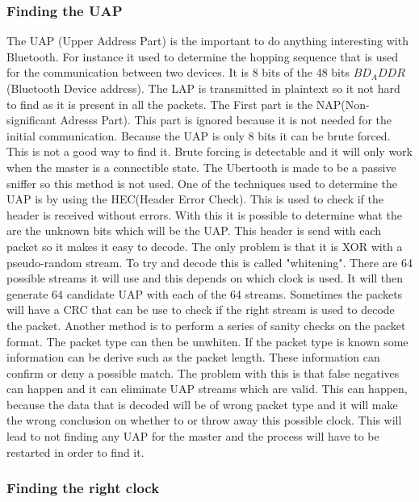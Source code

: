 \subsubsection{Finding the UAP}
\label{subsubsec:finding_uap}
The UAP (Upper Address Part) is the important to do anything interesting with Bluetooth. For instance it used to determine the hopping sequence that is used for the communication between two devices. It is 8 bits of the 48 bits $BD_ADDR$ (Bluetooth Device address). The LAP is transmitted in plaintext so it not hard to find as it is present in all the packets. The First part is the NAP(Non-significant Adresss Part). This part is ignored because it is not needed for the initial communication. Because the UAP is only 8 bits it can be brute forced. This is not a good way to find it. Brute forcing is detectable and it will only work when the master is a connectible state. 
The Ubertooth is made to be a passive sniffer so this method is not used. One of the techniques used to determine the UAP is by using the HEC(Header Error Check). This is used to check if the header is received without errors. With this it is possible to determine what the are the unknown bits which will be the UAP. This header is send with each packet so it makes it easy to decode. The only problem is that it is XOR with a pseudo-random stream. To try and decode this is called "whitening". There are 64 possible streams it will use and this depends on which clock is used. It will then generate 64 candidate UAP with each of the 64 streams. Sometimes the packets will have a CRC that can be use to check if the right stream is used to decode the packet.
Another method is to perform a series of sanity checks on the packet format. The packet type can then be unwhiten. If the packet type is known some information can be derive such as the packet length. These information can confirm or deny a possible match. The problem with this is that false negatives can happen and it can eliminate UAP streams which are valid. This can happen, because the data that is decoded will be of wrong packet type and it will make the wrong conclusion on whether to or throw away this possible clock. This will lead to not finding any UAP for the master and the process will have to be restarted in order to find it.

\subsubsection{Finding the right clock}
